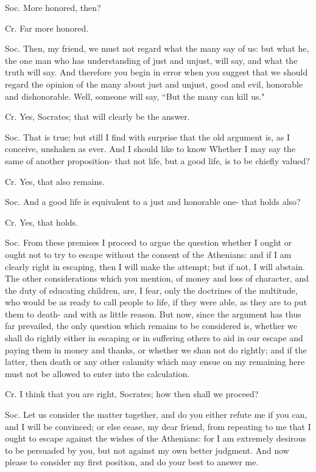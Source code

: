 Soc. More honored, then? 

Cr. Far more honored. 

Soc. Then, my friend, we must not regard what the many say of us:
but what he, the one man who has understanding of just and unjust,
will say, and what the truth will say. And therefore you begin in
error when you suggest that we should regard the opinion of the many
about just and unjust, good and evil, honorable and dishonorable.
Well, someone will say, ``But the many can kill us." 

Cr. Yes, Socrates; that will clearly be the answer. 

Soc. That is true; but still I find with surprise that the old argument
is, as I conceive, unshaken as ever. And I should like to know Whether
I may say the same of another proposition- that not life, but a good
life, is to be chiefly valued? 

Cr. Yes, that also remains. 

Soc. And a good life is equivalent to a just and honorable one- that
holds also? 

Cr. Yes, that holds. 

Soc. From these premises I proceed to argue the question whether I
ought or ought not to try to escape without the consent of the Athenians:
and if I am clearly right in escaping, then I will make the attempt;
but if not, I will abstain. The other considerations which you mention,
of money and loss of character, and the duty of educating children,
are, I fear, only the doctrines of the multitude, who would be as
ready to call people to life, if they were able, as they are to put
them to death- and with as little reason. But now, since the argument
has thus far prevailed, the only question which remains to be considered
is, whether we shall do rightly either in escaping or in suffering
others to aid in our escape and paying them in money and thanks, or
whether we shan not do rightly; and if the latter, then death or any
other calamity which may ensue on my remaining here must not be allowed
to enter into the calculation. 

Cr. I think that you are right, Socrates; how then shall we proceed?

Soc. Let us consider the matter together, and do you either refute
me if you can, and I will be convinced; or else cease, my dear friend,
from repeating to me that I ought to escape against the wishes of
the Athenians: for I am extremely desirous to be persuaded by you,
but not against my own better judgment. And now please to consider
my first position, and do your best to answer me. 

